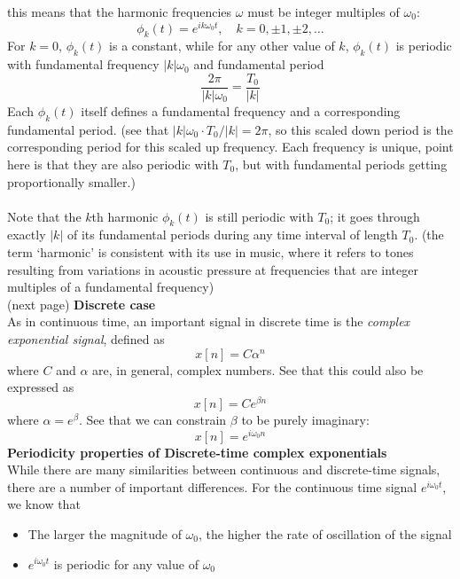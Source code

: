\documentclass{report}
\begin{document}
this means that the harmonic frequencies $\omega$ must be integer multiples of $\omega_0$:
\begin{equation*}
\phi_k(t)=e^{ik\omega_0t},\quad k=0,\pm1,\pm2,\ldots
\end{equation*}
For $k=0$, $\phi_k(t)$ is a constant, while for any other value of $k$, $\phi_k(t)$ is periodic with fundamental 
frequency $|k|\omega_0$ and fundamental period
\begin{equation*}
\frac{2\pi}{|k|\omega_0}=\frac{T_0}{|k|}
\end{equation*}
Each $\phi_k(t)$ itself defines a fundamental frequency and a corresponding fundamental period. 
(see that $|k|\omega_0\cdot T_0/|k|=2\pi$, so this scaled down period is the corresponding period
for this scaled up frequency. Each frequency is unique, point here is that they are also periodic with $T_0$, 
but with fundamental periods getting proportionally smaller.)\\
\vspace{1mm}\\
Note that the $k$th harmonic $\phi_k(t)$ is still periodic with $T_0$; it goes through exactly $|k|$ of its 
fundamental periods during any time interval of length $T_0$. (the term `harmonic' is consistent with its use in
music, where it refers to tones resulting from variations in acoustic pressure at frequencies that are integer
multiples of a fundamental frequency)\\
(next page)\newpage
\noindent\textbf{Discrete case}\\
As in continuous time, an important signal in discrete time is the \textit{complex exponential signal}, defined as
\begin{equation*}
x[n]=C\alpha^n
\end{equation*}
where $C$ and $\alpha$ are, in general, complex numbers. See that this could also be expressed as
\begin{equation*}
x[n]=Ce^{\beta n}
\end{equation*}
where $\alpha=e^\beta$. See that we can constrain $\beta$ to be purely imaginary:
\begin{equation*}
x[n]=e^{i\omega_0n}
\end{equation*}
\textbf{Periodicity properties of Discrete-time complex exponentials}\\
While there are many similarities between continuous and discrete-time signals, there are a number of important
differences. For the continuous time signal $e^{i\omega_0t}$, we know that
\begin{itemize}
\item The larger the magnitude of $\omega_0$, the higher the rate of oscillation of the signal
\item $e^{i\omega_0t}$ is periodic for any value of $\omega_0$
\end{itemize}
\end{document}
